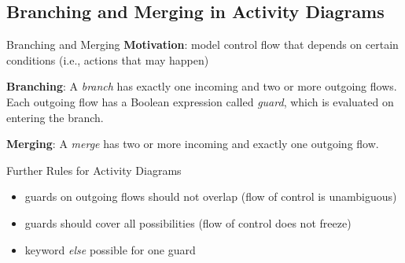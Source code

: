 \subsection{Branching and Merging in Activity Diagrams}
\begin{frame}{\insertsubsection}
	\begin{fancycolumns}[animation=none]
		\nextcolumn
		\begin{definition}{{Branching and Merging \mysource{\umluserguide}}}
			\textbf{Motivation}: model control flow that depends on certain conditions (i.e., actions that may happen)
			
			\textbf{Branching}: A \emph{branch} has exactly one incoming and two or more outgoing flows. Each outgoing flow has a Boolean expression called \emph{guard}, which is evaluated on entering the branch. 
			
			\textbf{Merging}: A \emph{merge} has two or more incoming and exactly one outgoing flow. 
		\end{definition}
		\pause
		\begin{note}{Further Rules for Activity Diagrams}
			\begin{itemize}
				\item guards on outgoing flows should not overlap (flow of control is unambiguous)
				\item guards should cover all possibilities (flow of control does not freeze)
				\item keyword \emph{else} possible for one guard 
			\end{itemize}
		\end{note}
	\end{fancycolumns}
\end{frame}


